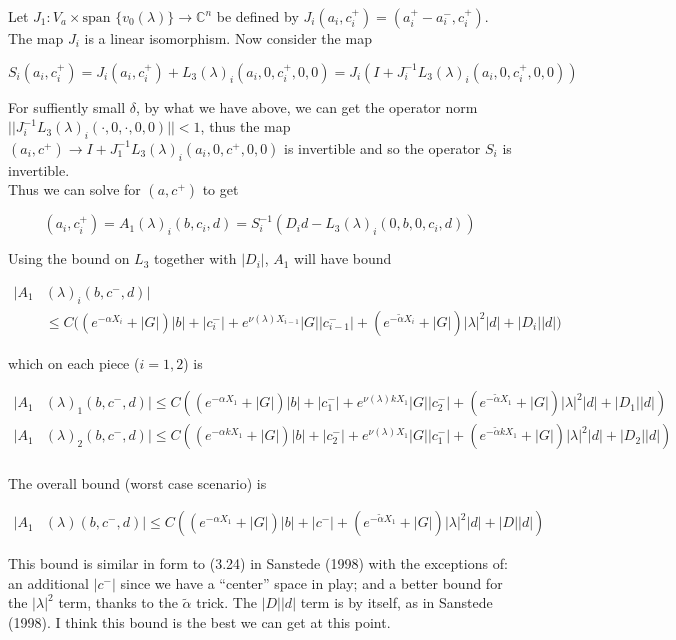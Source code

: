 \documentclass[12pt]{article}
\def\C{{\mathbb C}}
\begin{document}
\begin{enumerate}
Let $J_1: V_a \times \text{span }\{v_0(\lambda)\} \rightarrow \C^n$ be defined by $J_i(a_i, c_i^+) = (a_i^+ - a_i^-, c_i^+)$. The map $J_i$ is a linear isomorphism. Now consider the map

\[
S_i(a_i, c_i^+) = J_i (a_i, c_i^+) + L_3(\lambda)_i(a_i, 0, c_i^+, 0, 0) = J_i( I + J_i^{-1} L_3(\lambda)_i(a_i, 0, c_i^+, 0, 0))
\]

For suffiently small $\delta$, by what we have above, we can get the operator norm $||J_i^{-1} L_3(\lambda)_i(\cdot, 0, \cdot, 0, 0)|| < 1$, thus the map $(a_i, c^+) \rightarrow I + J_1^{-1} L_3(\lambda)_i(a_i, 0, c^+, 0, 0)$ is invertible and so the operator $S_i$ is invertible.\\

Thus we can solve for $(a, c^+)$ to get

\[
(a_i, c_i^+) = A_1(\lambda)_i(b, c_i, d) = S_i^{-1}(D_i d - L_3(\lambda)_i(0, b, 0, c_i, d))
\]

Using the bound on $L_3$ together with $|D_i|$, $A_1$ will have bound

\begin{align*}
|A_1&(\lambda)_i(b, c^-, d)| \\
&\leq C \Big( (e^{-\alpha X_i} + |G|) |b| 
+ |c_i^-| + e^{\nu(\lambda)X_{i-1}} |G||c_{i-1}^-| + (e^{-\tilde{\alpha} X_i} + |G|) |\lambda|^2 |d| + |D_i||d| \Big)
\end{align*} 

which on each piece ($i = 1, 2$) is

\begin{align*}
|A_1&(\lambda)_1(b, c^-, d)| \leq C ((e^{-\alpha X_1} + |G|) |b| + |c_1^-| + e^{\nu(\lambda)k X_1} |G||c_2^-| + (e^{-\tilde{\alpha} X_1} + |G|) |\lambda|^2 |d| + |D_1||d| ) \\
|A_1&(\lambda)_2(b, c^-, d)| \leq C ((e^{-\alpha k X_1} + |G|) |b| + |c_2^-| + e^{\nu(\lambda) X_1} |G||c_1^-| + (e^{-\tilde{\alpha} k X_1} + |G|) |\lambda|^2 |d| + |D_2||d| ) \\
\end{align*}

The overall bound (worst case scenario) is 

\begin{align*}
|A_1&(\lambda)(b, c^-, d)| \leq C( (e^{-\alpha X_1} + |G|) |b| + |c^-| + (e^{-\tilde{\alpha} X_1} + |G|) |\lambda|^2 |d| + |D| |d| )
\end{align*}

This bound is similar in form to (3.24) in Sanstede (1998) with the exceptions of: an additional $|c^-|$ since we have a ``center'' space in play; and a better bound for the $|\lambda|^2$ term, thanks to the $\tilde{\alpha}$ trick. The $|D| |d| $ term is by itself, as in Sanstede (1998). I think this bound is the best we can get at this point.


\end{enumerate}
\end{document}
